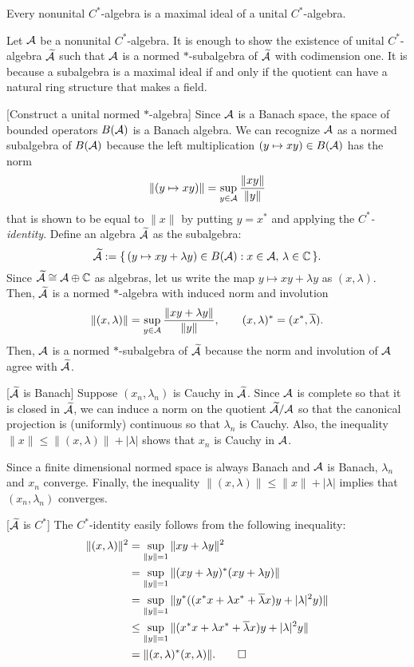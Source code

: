 \documentclass{../note}
\begin{document}
\begin{thm}
Every nonunital $C^*$-algebra is a maximal ideal of a unital $C^*$-algebra.
\end{thm}
\begin{pf}
Let $\mathcal{A}$ be a nonunital $C^*$-algebra.
It is enough to show the existence of unital $C^*$-algebra $\widetilde{\mathcal{A}}$ such that $\mathcal{A}$ is a normed $*$-subalgebra of $\widetilde{\mathcal{A}}$ with codimension one.
It is because a subalgebra is a maximal ideal if and only if the quotient can have a natural ring structure that makes a field.

[Construct a unital normed $*$-algebra]
Since $\mathcal{A}$ is a Banach space, the space of bounded operators $B(\mathcal{A})$ is a Banach algebra.
We can recognize $\mathcal{A}$ as a normed subalgebra of $B(\mathcal{A})$ because the left multiplication $(y\mapsto xy)\in B(\mathcal{A})$ has the norm
\[\|(y\mapsto xy)\|=\sup_{y\in\mathcal{A}}\frac{\|xy\|}{\|y\|}\]
that is shown to be equal to $\|x\|$ by putting $y=x^*$ and applying the \emph{$C^*$-identity}.
Define an algebra $\widetilde{\mathcal{A}}$ as the subalgebra:
\[\widetilde{\mathcal{A}}:=\{\,(y\mapsto xy+\lambda y)\in B(\mathcal{A}):x\in\mathcal{A},\,\lambda\in\mathbb{C}\,\}.\]
Since $\widetilde{\mathcal{A}}\cong\mathcal{A}\oplus\mathbb{C}$ as algebras, let us write the map $y\mapsto xy+\lambda y$ as $(x,\lambda)$.
Then, $\widetilde{\mathcal{A}}$ is a normed $*$-algebra with induced norm and involution
\[\|(x,\lambda)\|=\sup_{y\in\mathcal{A}}\frac{\|xy+\lambda y\|}{\|y\|},\qquad(x,\lambda)^*=(x^*,\overline{\lambda}).\]
Then, $\mathcal{A}$ is a normed $*$-subalgebra of $\widetilde{\mathcal{A}}$ because the norm and involution of $\mathcal{A}$ agree with $\widetilde{\mathcal{A}}$.

[$\widetilde{\mathcal{A}}$ is Banach]
Suppose $(x_n,\lambda_n)$ is Cauchy in $\widetilde{\mathcal{A}}$.
Since $\mathcal{A}$ is complete so that it is closed in $\widetilde{\mathcal{A}}$, we can induce a norm on the quotient $\widetilde{\mathcal{A}}/\mathcal{A}$ so that the canonical projection is (uniformly) continuous so that $\lambda_n$ is Cauchy.
Also, the inequality $\|x\|\le\|(x,\lambda)\|+|\lambda|$ shows that $x_n$ is Cauchy in $\mathcal{A}$.

Since a finite dimensional normed space is always Banach and $\mathcal{A}$ is Banach, $\lambda_n$ and $x_n$ converge.
Finally, the inequality $\|(x,\lambda)\|\le\|x\|+|\lambda|$ implies that $(x_n,\lambda_n)$ converges.

[$\widetilde{\mathcal{A}}$ is $C^*$]
The $C^*$-identity easily follows from the following inequality:
\begin{align*}
\|(x,\lambda)\|^2&=\sup_{\|y\|=1}\|xy+\lambda y\|^2\\
&=\sup_{\|y\|=1}\|(xy+\lambda y)^*(xy+\lambda y)\|\\
&=\sup_{\|y\|=1}\|y^*((x^*x+\lambda x^*+\overline\lambda x)y+|\lambda|^2y)\|\\
&\le\sup_{\|y\|=1}\|(x^*x+\lambda x^*+\overline\lambda x)y+|\lambda|^2y\|\\
&=\|(x,\lambda)^*(x,\lambda)\|.\qedhere
\end{align*}
\end{pf}
\end{document}
